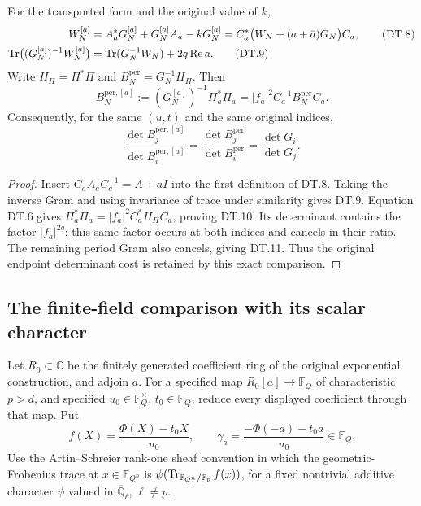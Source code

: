 \begin{proposition}
For the transported form and the original value of \(k\),
\begin{align}
 W_N^{[a]}&=A_a^*G_N^{[a]}+G_N^{[a]}A_a-kG_N^{[a]}
       =C_a^*\bigl(W_N+(a+\bar a)G_N\bigr)C_a,\tag{DT.8}\\
 \operatorname{Tr}\bigl((G_N^{[a]})^{-1}W_N^{[a]}\bigr)
       &=\operatorname{Tr}(G_N^{-1}W_N)+2q\operatorname{Re}a.\tag{DT.9}
\end{align}
Write \(H_\Pi=\Pi^*\Pi\) and
\(B_N^{\mathrm{per}}=G_N^{-1}H_\Pi\). Then
\begin{equation}\tag{DT.10}
 B_N^{\mathrm{per},[a]}
  :=(G_N^{[a]})^{-1}\Pi_a^*\Pi_a
   =|f_a|^2 C_a^{-1}B_N^{\mathrm{per}}C_a.
\end{equation}
Consequently, for the same \((u,t)\) and the same original indices,
\begin{equation}\tag{DT.11}
 \frac{\det B_j^{\mathrm{per},[a]}}{\det B_i^{\mathrm{per},[a]}}
   =\frac{\det B_j^{\mathrm{per}}}{\det B_i^{\mathrm{per}}}
   =\frac{\det G_i}{\det G_j}.
\end{equation}
\end{proposition}
\begin{proof}
Insert \(C_aA_aC_a^{-1}=A+aI\) into the first definition of DT.8.
Taking the inverse Gram and using invariance of trace under similarity
gives DT.9. Equation DT.6 gives
\(\Pi_a^*\Pi_a=|f_a|^2C_a^*H_\Pi C_a\), proving DT.10.
Its determinant contains the factor \(|f_a|^{2q}\); this same factor
occurs at both indices and cancels in their ratio. The remaining period
Gram also cancels, giving DT.11. Thus the original endpoint determinant
cost is retained by this exact comparison.
\end{proof}

\subsection{The finite-field comparison with its scalar character}
Let \(R_0\subset\mathbb C\) be the finitely generated coefficient ring
of the original exponential construction, and adjoin \(a\). For a
specified map \(R_0[a]\to\mathbb F_Q\) of characteristic \(p>d\),
and specified \(u_0\in\mathbb F_Q^\times\), \(t_0\in\mathbb F_Q\),
reduce every displayed coefficient through that map. Put
\[
 f(X)=\frac{\Phi(X)-t_0X}{u_0},\qquad
 \gamma_a=\frac{-\Phi(-a)-t_0a}{u_0}\in\mathbb F_Q.
\]
Use the Artin--Schreier rank-one sheaf convention in which the
geometric-Frobenius trace at \(x\in\mathbb F_{Q^n}\) is
\(\psi(\operatorname{Tr}_{\mathbb F_{Q^n}/\mathbb F_p}f(x))\), for a fixed
nontrivial additive character \(\psi\) valued in
\(\overline{\mathbb Q}_\ell\), \(\ell\ne p\).

